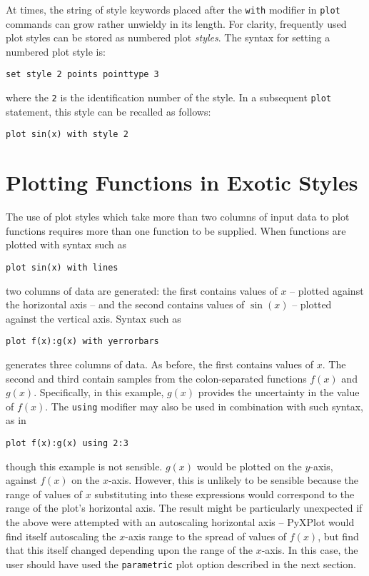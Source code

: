 At times, the string of style keywords placed after the {\tt with} modifier in
{\tt plot} commands can grow rather unwieldy in its length. For clarity,
frequently used plot styles can be stored as numbered plot {\it styles}.  The
syntax for setting a numbered plot style is:

\begin{verbatim}
set style 2 points pointtype 3
\end{verbatim}

\noindent where the {\tt 2} is the identification number of the style. In a
subsequent {\tt plot} statement, this style can be recalled as follows:

\begin{verbatim}
plot sin(x) with style 2
\end{verbatim}

\section{Plotting Functions in Exotic Styles}

The use of plot styles which take more than two columns of input data to plot
functions requires more than one function to be supplied.  When functions are
plotted with syntax such as

\begin{verbatim}
plot sin(x) with lines
\end{verbatim}

\noindent two columns of data are generated: the first contains values of $x$
-- plotted against the horizontal axis -- and the second contains values of
$\sin(x)$ -- plotted against the vertical axis. Syntax such as

\begin{verbatim}
plot f(x):g(x) with yerrorbars
\end{verbatim}

\noindent generates three columns of data. As before, the first contains values
of $x$. The second and third contain samples from the colon-separated functions
$f(x)$ and $g(x)$. Specifically, in this example, $g(x)$ provides the
uncertainty in the value of $f(x)$.  The {\tt using} modifier may also be used
in combination with such syntax, as in

\begin{verbatim}
plot f(x):g(x) using 2:3
\end{verbatim}

\noindent though this example is not sensible. $g(x)$ would be plotted on the
$y$-axis, against $f(x)$ on the $x$-axis. However, this is unlikely to be
sensible because the range of values of $x$ substituting into these expressions
would correspond to the range of the plot's horizontal axis. The result might
be particularly unexpected if the above were attempted with an autoscaling
horizontal axis -- PyXPlot would find itself autoscaling the $x$-axis range to
the spread of values of $f(x)$, but find that this itself changed depending
upon the range of the $x$-axis. In this case, the user should have used the
{\tt parametric} plot option described in the next section.

